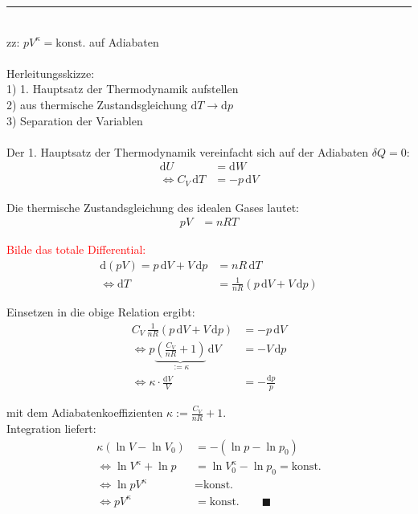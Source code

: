 \documentclass{article}
\newcommand{\diff}{\mathrm{d}}
\newcommand{\lr}[1]{\left(#1\right)}
\begin{document}
{\color{violet}
\hrule
	\\
	zz: $p V^\kappa = \text{konst.}$ auf Adiabaten\\
	\\
	Herleitungsskizze:\\
	1) 1. Hauptsatz der Thermodynamik aufstellen \\
	2) aus thermische Zustandsgleichung $\diff T \to \diff p$ \\
	3) Separation der Variablen \\
	\\
	Der 1. Hauptsatz der Thermodynamik vereinfacht sich auf der Adiabaten $\delta Q = 0$:
		\begin{align*}
			\diff U &= \diff W \\
			\Leftrightarrow C_V \, \diff T &= - p \, \diff V
		\end{align*}
	
	Die thermische Zustandsgleichung des idealen Gases lautet:
		\begin{align*}
			p V &= n R T
		\end{align*}
	
	\textcolor{red}{Bilde das totale Differential:}
		\begin{align*}
			\diff(p V) = p \, \diff V + V \, \diff p &= n R \, \diff T \\
			\Leftrightarrow \diff T &= \frac{1}{n R} \lr{ p \, \diff V + V \, \diff p }
		\end{align*}
	
	Einsetzen in die obige Relation ergibt:
		\begin{align*}
			C_V \, \frac{1}{n R} \lr{ p \, \diff V + V \, \diff p } &= -p \, \diff V \\
			\Leftrightarrow p \underbrace{ \lr{ \frac{C_V}{n R} + 1 } }_{:= \kappa} \, \diff V &= -V \, \diff p \\
			\Leftrightarrow \kappa \cdot \frac{\diff V}{V} &= -\frac{\diff p}{p}
		\end{align*}
	
	mit dem Adiabatenkoeffizienten $\kappa := \frac{C_V}{nR} + 1$.\\
	Integration liefert:
		\begin{align*}
			\kappa (\ln V - \ln V_0) &= - (\ln p - \ln p_0) \\
			\Leftrightarrow \ln V^\kappa + \ln p &= \ln V_0^\kappa - \ln p_0 = \text{konst.} \\
			\Leftrightarrow \ln p V^\kappa &= \text{konst.} \\
			\Leftrightarrow p V^\kappa &= \text{konst.} \qquad \blacksquare
		\end{align*}


}
\end{document}
